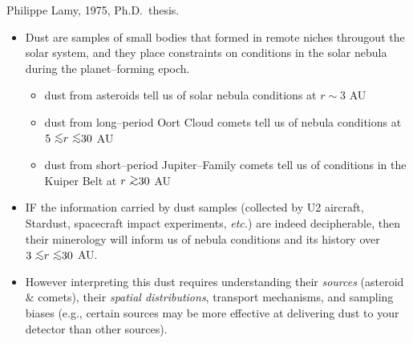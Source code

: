 \documentclass[20pt,35mmSlide,landscape]{foils}
\newcommand{\gtrsim}{\mbox{ \lower0.5ex\hbox{$\sim$} \kern-1.1em 
                 \raise0.5ex\hbox{$>$}}}
\newcommand{\lesssim}{\mbox{ \lower0.5ex\hbox{$\sim$} \kern-1.1em 
                 \raise0.5ex\hbox{$<$}}}
\begin{document}
{\small Philippe Lamy, 1975, Ph.D.\ thesis.}

\newpage
\pagecolor{light-yellow}
\small

\vspace*{-1.5in}\begin{itemize}

\item Dust are samples of small bodies that formed in remote
niches througout the solar system, and they place
constraints on conditions in the solar nebula during the
planet--forming epoch.\vspace*{1ex}

\begin{itemize}

\item dust from asteroids tell us of solar nebula conditions
at $r\sim3$ AU\vspace*{1ex}

\item dust from long--period Oort Cloud comets tell us of nebula
conditions at $5\lesssim r\lesssim30$ AU\vspace*{1ex}

\item dust from short--period Jupiter--Family comets tell us
of conditions in the\\ Kuiper Belt at $r\gtrsim30$ AU\\

\end{itemize}

\item IF the information carried by dust samples
(collected by U2 aircraft, Stardust, spacecraft impact
experiments, {\it etc.}) are indeed decipherable, then their
minerology will inform us of nebula conditions and its history
over $3\lesssim r\lesssim30$ AU.\\

\item However interpreting this dust requires understanding their
{\sl sources} (asteroid \& comets), their {\sl spatial
distributions}, transport mechanisms, and sampling biases
(e.g., certain sources may be more effective at delivering dust
to your detector than other sources).

\end{itemize}

\pagecolor{light-yellow}
\normalsize
\end{document}
